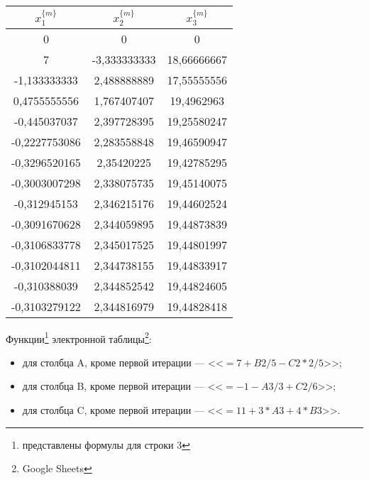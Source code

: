 \documentclass[10pt, a4paper, titlepage]{article}
\begin{document}
\begin{center}
    \begin{tabular}{|c|c|c|}
        \hline
        $x_1^{\{m\}}$ & $x_2^{\{m\}}$ & $x_3^{\{m\}}$ \\ \hline
        
        0 & 0 & 0 \\ \hline
        
        7 & -3,333333333 & 18,66666667 \\ \hline
        
        -1,133333333 & 2,488888889 & 17,55555556 \\ \hline
        
        0,4755555556 & 1,767407407 & 19,4962963 \\ \hline
        
        -0,445037037 & 2,397728395 & 19,25580247 \\ \hline
        
        -0,2227753086 & 2,283558848 & 19,46590947 \\ \hline
        
        -0,3296520165 & 2,35420225 & 19,42785295 \\ \hline
        
        -0,3003007298 & 2,338075735 & 19,45140075 \\ \hline
        
        -0,312945153 & 2,346215176 & 19,44602524 \\ \hline
        
        -0,3091670628 & 2,344059895 & 19,44873839 \\ \hline
        
        -0,3106833778 & 2,345017525 & 19,44801997 \\ \hline
        
        -0,3102044811 & 2,344738155 & 19,44833917 \\ \hline
        
        -0,310388039 & 2,344852542 & 19,44824605 \\ \hline
        
        -0,3103279122 & 2,344816979 & 19,44828418 \\ \hline
        
    \end{tabular}
\end{center}

Функции\footnote{представлены формулы для строки 3} электронной таблицы\footnote{Google Sheets}:
\begin{itemize}
    \item для столбца A, кроме первой итерации --- <<$=7+B2/5-C2*2/5$>>;
    
    \item для столбца B, кроме первой итерации  --- <<$=-1-A3/3+C2/6$>>;
    
    \item для столбца C, кроме первой итерации --- <<$=11+3*A3+4*B3$>>.
    
\end{itemize}
\end{document}

